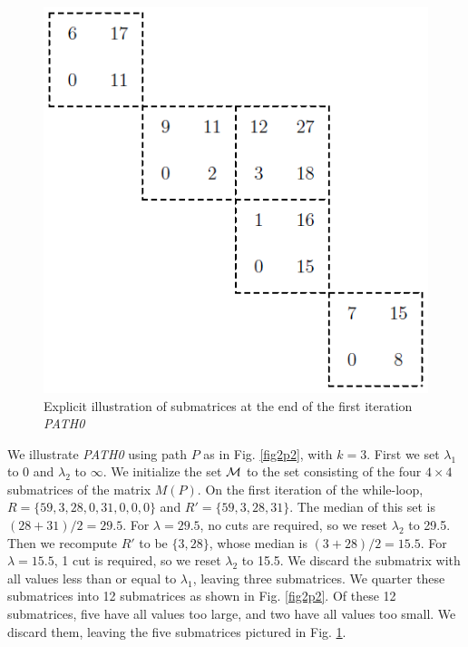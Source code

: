 \begin{figure}[thb]
\begin{center}
\includegraphics{fig2p3}
\end{center}
\caption{\small Explicit illustration of submatrices at the end of the first iteration {\it PATH0}}
\label{fig2p3}
\end{figure}

We illustrate {\it PATH0} using path $P$ as in Fig. \ref{fig2p2}, with $k=3$.
First we set $\lambda_1$ to 0 and $\lambda_2$ to $\infty$.
We initialize the set $\cal M$ to the set consisting of
the four $4 \times 4$ submatrices of the matrix $M(P)$.
On the first iteration of the while-loop,
$R= \{59,3,28,0,31,0,0,0\}$ and $R'= \{59,3,28,31\}$.
The median of this set is $(28+31)/2 = 29.5$.
For $\lambda = 29.5$, no cuts are required, so we reset $\lambda_2$ to 29.5.
Then we recompute $R'$ to be $\{3,28\}$, whose median is $(3+28)/2 = 15.5$. 
For $\lambda = 15.5$, 1 cut is required, so we reset $\lambda_2$ to 15.5. 
We discard the submatrix with all values less than or equal to $\lambda_1$, leaving three submatrices. 
We quarter these submatrices into 12 submatrices as shown in Fig. \ref{fig2p2}.
Of these 12 submatrices, five have all values too large, and two have all values too small.
We discard them, leaving the five submatrices pictured in Fig. \ref{fig2p3}.

